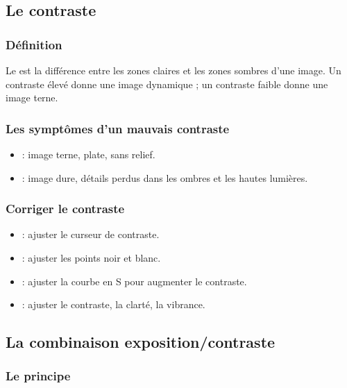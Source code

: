 \subsection{Le contraste}

\subsubsection{Définition}

Le  est la différence entre les zones claires et les zones sombres d'une image. Un contraste élevé donne une image dynamique ; un contraste faible donne une image terne.

\subsubsection{Les symptômes d'un mauvais contraste}

\begin{itemize}
    \item {} : image terne, plate, sans relief.
    \item {} : image dure, détails perdus dans les ombres et les hautes lumières.
\end{itemize}

\subsubsection{Corriger le contraste}

\begin{itemize}
    \item {} : ajuster le curseur de contraste.
    \item {} : ajuster les points noir et blanc.
    \item {} : ajuster la courbe en S pour augmenter le contraste.
    \item {} : ajuster le contraste, la clarté, la vibrance.
\end{itemize}

\subsection{La combinaison exposition/contraste}

\subsubsection{Le principe}

